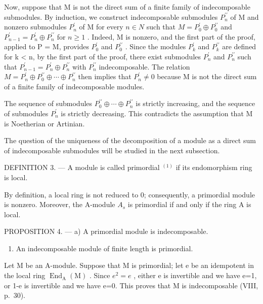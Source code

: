 Now, suppose that M is not the direct sum of a finite family of indecomposable submodules. By induction, we construct indecomposable submodules \(P_{n}^{\prime\prime}\) of M and nonzero submodules \(P_{n}^{\prime}\) of M for every \(n \in N\) such that \(M = P_{0}^{\prime} \oplus P_{0}^{\prime\prime}\) and \(P_{n-1}^{\prime} = P_{n}^{\prime} \oplus P_{n}^{\prime\prime}\) for \(n \geqslant 1\) . Indeed, M is nonzero, and the first part of the proof, applied to P = M, provides \(P_{0}^{\prime}\) and \(P_{0}^{\prime\prime}\) . Since the modules \(P_{k}^{\prime}\) and \(P_{k}^{\prime\prime}\) are defined for k \textless{} n, by the first part of the proof, there exist submodules \(P_{n}^{\prime}\) and \(P_{n}^{\prime\prime}\) such that \(P_{n-1}^{\prime} = P_{n}^{\prime} \oplus P_{n}^{\prime\prime}\) with \(P_{n}^{\prime\prime}\) indecomposable. The relation \(M = P_{n}^{\prime} \oplus P_{0}^{\prime\prime} \oplus \cdots \oplus P_{n}^{\prime\prime}\) then implies that \(P_{n}^{\prime} \neq 0\) because M is not the direct sum of a finite family of indecomposable modules.

The sequence of submodules \(P_{0}^{\prime\prime} \oplus \cdots \oplus P_{n}^{\prime\prime}\) is strictly increasing, and the sequence of submodules \(P_{n}^{\prime}\) is strictly decreasing. This contradicts the assumption that M is Noetherian or Artinian.

The question of the uniqueness of the decomposition of a module as a direct sum of indecomposable submodules will be studied in the next subsection.

DEFINITION 3. --- A module is called primordial \(^{(1)}\) if its endomorphism ring is local.

By definition, a local ring is not reduced to 0; consequently, a primordial module is nonzero. Moreover, the A-module \(A_{s}\) is primordial if and only if the ring A is local.

PROPOSITION 4. --- a) A primordial module is indecomposable.

\begin{enumerate}
\def\labelenumi{\alph{enumi})}
\setcounter{enumi}{1}
\tightlist
\item
  An indecomposable module of finite length is primordial.
\end{enumerate}

Let M be an A-module. Suppose that M is primordial; let e be an idempotent in the local ring \(\operatorname{End}_{\mathrm{A}}(\mathrm{M})\) . Since \(e^{2}=e\) , either e is invertible and we have e=1, or 1-e is invertible and we have e=0. This proves that M is indecomposable (VIII, p.~30).

